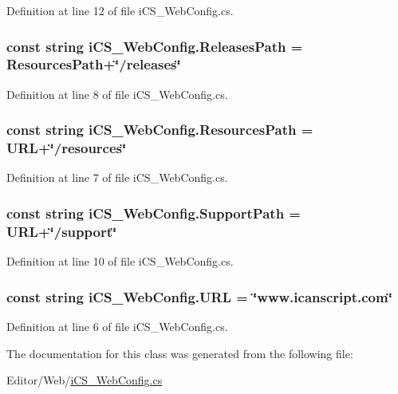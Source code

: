 Definition at line 12 of file i\+C\+S\+\_\+\+Web\+Config.\+cs.

\hypertarget{classi_c_s___web_config_aa91ba3ed91c00bdad22566a78d692c6c}{
\subsubsection[{Releases\+Path}]{\setlength{\rightskip}{0pt plus 5cm}const string i\+C\+S\+\_\+\+Web\+Config.\+Releases\+Path = {\bf Resources\+Path}+\char`\"{}/releases\char`\"{}}}\label{classi_c_s___web_config_aa91ba3ed91c00bdad22566a78d692c6c}


Definition at line 8 of file i\+C\+S\+\_\+\+Web\+Config.\+cs.

\hypertarget{classi_c_s___web_config_ab6ae9a366d579574b96f274beeec701b}{
\subsubsection[{Resources\+Path}]{\setlength{\rightskip}{0pt plus 5cm}const string i\+C\+S\+\_\+\+Web\+Config.\+Resources\+Path = {\bf U\+R\+L}+\char`\"{}/resources\char`\"{}}}\label{classi_c_s___web_config_ab6ae9a366d579574b96f274beeec701b}


Definition at line 7 of file i\+C\+S\+\_\+\+Web\+Config.\+cs.

\hypertarget{classi_c_s___web_config_ab6cc3cf3da2ae106f6fc04e5ee35d634}{
\subsubsection[{Support\+Path}]{\setlength{\rightskip}{0pt plus 5cm}const string i\+C\+S\+\_\+\+Web\+Config.\+Support\+Path = {\bf U\+R\+L}+\char`\"{}/support\char`\"{}}}\label{classi_c_s___web_config_ab6cc3cf3da2ae106f6fc04e5ee35d634}


Definition at line 10 of file i\+C\+S\+\_\+\+Web\+Config.\+cs.

\hypertarget{classi_c_s___web_config_aacbcdf2adb3b138c8169d647adf32b90}{
\subsubsection[{U\+R\+L}]{\setlength{\rightskip}{0pt plus 5cm}const string i\+C\+S\+\_\+\+Web\+Config.\+U\+R\+L = \char`\"{}www.\+icanscript.\+com\char`\"{}}}\label{classi_c_s___web_config_aacbcdf2adb3b138c8169d647adf32b90}


Definition at line 6 of file i\+C\+S\+\_\+\+Web\+Config.\+cs.



The documentation for this class was generated from the following file\+:\begin{DoxyCompactItemize}
\item 
Editor/\+Web/\hyperlink{i_c_s___web_config_8cs}{i\+C\+S\+\_\+\+Web\+Config.\+cs}\end{DoxyCompactItemize}
